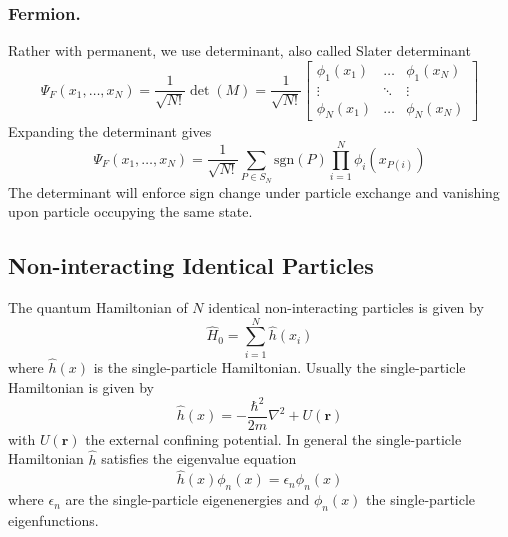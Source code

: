 \documentclass[../../../main.tex]{subfiles}
\begin{document}
\subsubsection{Fermion.}
Rather with permanent, we use determinant, also called Slater determinant
\begin{equation*}
  \Psi_F(x_1, \ldots, x_N) = \frac{1}{\sqrt{N!}} \det(M)
  = \frac{1}{\sqrt{N!}} \begin{bmatrix}
    \phi_1(x_1) & \ldots & \phi_1(x_N) \\
    \vdots      & \ddots & \vdots      \\
    \phi_N(x_1) & \ldots & \phi_N(x_N)
  \end{bmatrix}
\end{equation*}
Expanding the determinant gives
\begin{equation*}
  \Psi_F(x_1, \ldots, x_N) = \frac{1}{\sqrt{N!}} \sum_{P \in S_N} \text{sgn}(P) \prod_{i=1}^N \phi_i(x_{P(i)})
\end{equation*}
The determinant will enforce sign change under particle exchange and vanishing upon particle occupying the same state.

\subsection{Non-interacting Identical Particles}
The quantum Hamiltonian of \( N \) identical non-interacting particles is given by
\begin{equation*}
  \hat{H}_0 = \sum_{i=1}^{N} \hat{h}(x_i)
\end{equation*}
where \( \hat{h}(x) \) is the single-particle Hamiltonian.
Usually the single-particle Hamiltonian is given by
\begin{equation*}
  \hat{h}(x) = -\frac{\hbar^2}{2m} \nabla^2 + U(\mathbf{r})
\end{equation*}
with \( U(\mathbf{r}) \) the external confining potential.
In general the single-particle Hamiltonian \( \hat{h} \) satisfies the eigenvalue equation
\begin{equation*}
  \hat{h}(x) \phi_n(x) = \epsilon_n \phi_n(x)
\end{equation*}
where $\epsilon_n $ are the single-particle eigenenergies and $\phi_n(x)$ the single-particle eigenfunctions.
\end{document}
